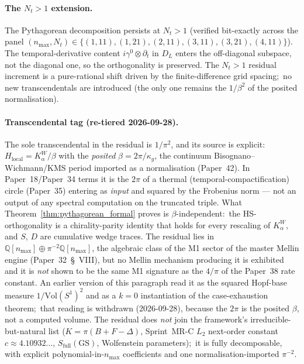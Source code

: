 \documentclass[11pt,a4paper]{article}
\theoremstyle{plain}
\theoremstyle{definition}
\newcommand{\nmax}{n_{\max}}
\newcommand{\Nt}{N_t}
\newcommand{\Q}{\mathbb{Q}}
\newcommand{\Vol}{\mathrm{Vol}}
\newcommand{\DL}{D_{L}}
\begin{document}
\paragraph{The $\Nt > 1$ extension.}
The Pythagorean decomposition persists at $\Nt > 1$ (verified
bit-exactly across the panel $(\nmax, N_t) \in
\{(1, 11), (1, 21), (2, 11), (3, 11), (3, 21), (4, 11)\}$). The
temporal-derivative content $i\gamma^0 \otimes \partial_t$ in
$\DL$ enters the off-diagonal subspace, not the diagonal one, so
the orthogonality is preserved. The $\Nt > 1$ residual increment
is a pure-rational shift driven by the finite-difference grid
spacing;\ no new transcendentals are introduced (the only one remains
the $1/\beta^{2}$ of the posited normalisation).

\paragraph{Transcendental tag (re-tiered 2026-09-28).}
The sole transcendental in the residual is $1/\pi^2$, and its source is
explicit:\ $H_{\mathrm{local}} = K_\alpha^W/\beta$ with the \emph{posited}
$\beta = 2\pi/\kappa_g$, the continuum Bisognano--Wichmann/KMS period
imported as a normalisation (Paper~42). In Paper~18/Paper~34 terms it is
the $2\pi$ of a thermal (temporal-compactification) circle
(Paper~35) entering as \emph{input} and squared by the Frobenius norm ---
not an output of any spectral computation on the truncated triple. What
Theorem~\ref{thm:pythagorean_formal} proves is $\beta$-independent:\ the
HS-orthogonality is a chirality-parity identity that holds for every
rescaling of $K_\alpha^W$, and $S$, $D$ are cumulative wedge traces. The
residual lies in $\Q[\nmax] \oplus \pi^{-2}\Q[\nmax]$, the algebraic class
of the M1 sector of the master Mellin engine (Paper~32~\S~VIII), but no
Mellin mechanism producing it is exhibited and it is \emph{not} shown to be
the same M1 signature as the $4/\pi$ of the Paper~38 rate constant. An
earlier version of this paragraph read it as the squared Hopf-base measure
$1/\Vol(S^1)^2$ and as a $k = 0$ instantiation of the case-exhaustion
theorem;\ that reading is withdrawn (2026-09-28), because the $2\pi$ is the
posited $\beta$, not a computed volume. The residual does \emph{not} join
the framework's irreducible-but-natural list ($K = \pi(B + F - \Delta)$,
Sprint~MR-C $L_2$ next-order constant $c \approx 4.10932\ldots$,
$S_{\mathrm{full}}(\mathrm{GS})$, Wolfenstein parameters);\ it is fully
decomposable, with explicit polynomial-in-$\nmax$ coefficients and one
normalisation-imported $\pi^{-2}$.
\end{document}
